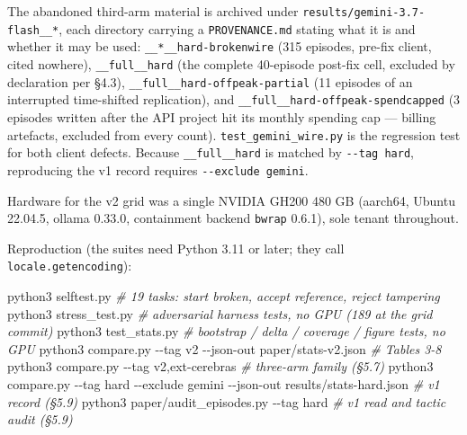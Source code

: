 \documentclass[
  10pt,
  a4paper,
]{article}
\newenvironment{Shaded}{}{}
\newcommand{\AttributeTok}[1]{\textcolor[rgb]{0.49,0.56,0.16}{#1}}
\newcommand{\CommentTok}[1]{\textcolor[rgb]{0.38,0.63,0.69}{\textit{#1}}}
\newcommand{\ExtensionTok}[1]{#1}
\newcommand{\NormalTok}[1]{#1}
\let\oldtexttt\texttt
\renewcommand{\texttt}[1]{{\small\oldtexttt{#1}}}
\begin{document}
The abandoned third-arm material is archived under
\texttt{results/gemini-3.7-flash\_\_*}, each directory carrying a
\texttt{PROVENANCE.md} stating what it is and whether it may be used:
\texttt{\_\_*\_\_hard-brokenwire} (315 episodes, pre-fix client, cited
nowhere), \texttt{\_\_full\_\_hard} (the complete 40-episode post-fix
cell, excluded by declaration per §4.3),
\texttt{\_\_full\_\_hard-offpeak-partial} (11 episodes of an interrupted
time-shifted replication), and
\texttt{\_\_full\_\_hard-offpeak-spendcapped} (3 episodes written after
the API project hit its monthly spending cap --- billing artefacts,
excluded from every count). \texttt{test\_gemini\_wire.py} is the
regression test for both client defects. Because
\texttt{\_\_full\_\_hard} is matched by \texttt{-\/-tag\ hard},
reproducing the v1 record requires \texttt{-\/-exclude\ gemini}.

Hardware for the v2 grid was a single NVIDIA GH200 480 GB (aarch64,
Ubuntu 22.04.5, ollama 0.33.0, containment backend \texttt{bwrap}
0.6.1), sole tenant throughout.

Reproduction (the suites need Python 3.11 or later; they call
\texttt{locale.getencoding}):

\begin{Shaded}
\begin{Highlighting}[]
\ExtensionTok{python3}\NormalTok{ selftest.py                 }\CommentTok{\# 19 tasks: start broken, accept reference, reject tampering}
\ExtensionTok{python3}\NormalTok{ stress\_test.py              }\CommentTok{\# adversarial harness tests, no GPU (189 at the grid commit)}
\ExtensionTok{python3}\NormalTok{ test\_stats.py               }\CommentTok{\# bootstrap / delta / coverage / figure tests, no GPU}
\ExtensionTok{python3}\NormalTok{ compare.py }\AttributeTok{{-}{-}tag}\NormalTok{ v2 }\AttributeTok{{-}{-}json{-}out}\NormalTok{ paper/stats{-}v2.json         }\CommentTok{\# Tables 3{-}8}
\ExtensionTok{python3}\NormalTok{ compare.py }\AttributeTok{{-}{-}tag}\NormalTok{ v2,ext{-}cerebras                            }\CommentTok{\# three{-}arm family (§5.7)}
\ExtensionTok{python3}\NormalTok{ compare.py }\AttributeTok{{-}{-}tag}\NormalTok{ hard }\AttributeTok{{-}{-}exclude}\NormalTok{ gemini }\AttributeTok{{-}{-}json{-}out}\NormalTok{ results/stats{-}hard.json   }\CommentTok{\# v1 record (§5.9)}
\ExtensionTok{python3}\NormalTok{ paper/audit\_episodes.py }\AttributeTok{{-}{-}tag}\NormalTok{ hard                          }\CommentTok{\# v1 read and tactic audit (§5.9)}
\end{Highlighting}
\end{Shaded}
\end{document}

